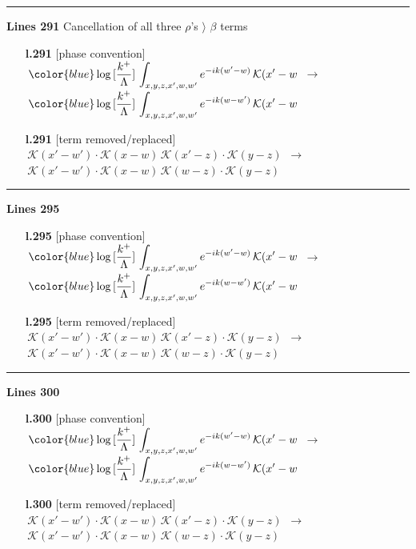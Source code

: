 \documentclass[10pt]{article}
\begin{document}
\noindent\rule{\linewidth}{0.3pt}\par\noindent\textbf{Lines 291} \quad \textsf{Cancellation of all three $\rho$'s $\rangle$ $\beta$ terms} \par
\begin{itemize}[leftmargin=2.2em,itemsep=1pt,topsep=2pt]
\item[\textbf{l.291}] \textsf{\small [phase convention]} $\displaystyle \,{\color{blue}\log{[\frac{k^{+}}{\Lambda}]}}\,\int_{x,y,z,x',w,w'}e^{-ik(w'-w)}\,\mathcal{K}(x'-w$\ $\longrightarrow$\ $\displaystyle \,{\color{blue}\log{[\frac{k^{+}}{\Lambda}]}}\,\int_{x,y,z,x',w,w'}e^{-ik(w-w')}\,\mathcal{K}(x'-w$
\item[\textbf{l.291}] \textsf{\small [term removed/replaced]} $\displaystyle \,\mathcal{K}(x'-w')\cdot\mathcal{K}(x-w)\,\mathcal{K}(x'-z)\cdot\mathcal{K}(y-z)$\ $\longrightarrow$\ $\displaystyle \,\mathcal{K}(x'-w')\cdot\mathcal{K}(x-w)\,\mathcal{K}(w-z)\cdot\mathcal{K}(y-z)$
\end{itemize}
\noindent\rule{\linewidth}{0.3pt}\par\noindent\textbf{Lines 295} \par
\begin{itemize}[leftmargin=2.2em,itemsep=1pt,topsep=2pt]
\item[\textbf{l.295}] \textsf{\small [phase convention]} $\displaystyle \,{\color{blue}\log{[\frac{k^{+}}{\Lambda}]}}\,\int_{x,y,z,x',w,w'}e^{-ik(w'-w)}\,\mathcal{K}(x'-w$\ $\longrightarrow$\ $\displaystyle \,{\color{blue}\log{[\frac{k^{+}}{\Lambda}]}}\,\int_{x,y,z,x',w,w'}e^{-ik(w-w')}\,\mathcal{K}(x'-w$
\item[\textbf{l.295}] \textsf{\small [term removed/replaced]} $\displaystyle \,\mathcal{K}(x'-w')\cdot\mathcal{K}(x-w)\,\mathcal{K}(x'-z)\cdot\mathcal{K}(y-z)$\ $\longrightarrow$\ $\displaystyle \,\mathcal{K}(x'-w')\cdot\mathcal{K}(x-w)\,\mathcal{K}(w-z)\cdot\mathcal{K}(y-z)$
\end{itemize}
\noindent\rule{\linewidth}{0.3pt}\par\noindent\textbf{Lines 300} \par
\begin{itemize}[leftmargin=2.2em,itemsep=1pt,topsep=2pt]
\item[\textbf{l.300}] \textsf{\small [phase convention]} $\displaystyle \,{\color{blue}\log{[\frac{k^{+}}{\Lambda}]}}\,\int_{x,y,z,x',w,w'}e^{-ik(w'-w)}\,\mathcal{K}(x'-w$\ $\longrightarrow$\ $\displaystyle \,{\color{blue}\log{[\frac{k^{+}}{\Lambda}]}}\,\int_{x,y,z,x',w,w'}e^{-ik(w-w')}\,\mathcal{K}(x'-w$
\item[\textbf{l.300}] \textsf{\small [term removed/replaced]} $\displaystyle \,\mathcal{K}(x'-w')\cdot\mathcal{K}(x-w)\,\mathcal{K}(x'-z)\cdot\mathcal{K}(y-z)$\ $\longrightarrow$\ $\displaystyle \,\mathcal{K}(x'-w')\cdot\mathcal{K}(x-w)\,\mathcal{K}(w-z)\cdot\mathcal{K}(y-z)$
\end{itemize}
\end{document}
